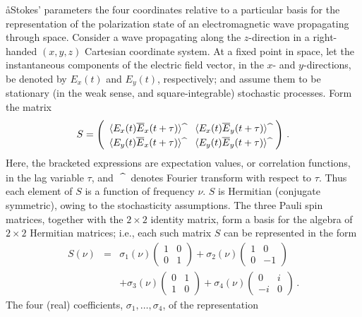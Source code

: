 \aa{Stokes' parameters}
the four coordinates relative to a particular basis
for the representation of the polarization state
of an electromagnetic wave propagating through space.
Consider a wave propagating along the
$z$-direction in a right-handed $(x,y,z)$ Cartesian coordinate system.
At a fixed point in space, let the instantaneous components of the
electric field vector, in the $x$-  and $y$-directions, be denoted
by $E_x(t)$ and $E_y(t)$, respectively; and assume them to be
stationary (in the weak sense, and square-integrable)
stochastic processes.
Form the matrix
$$S=\left( \begin{array}{ll}
             \langle E_x(t)\overline{E}_x(t+\tau)\rangle^\hatsymbol
           & \langle E_x(t)\overline{E}_y(t+\tau)\rangle^\hatsymbol\\
             \langle E_y(t)\overline{E}_x(t+\tau)\rangle^\hatsymbol
           & \langle E_y(t)\overline{E}_y(t+\tau)\rangle^\hatsymbol
            \end{array}\right)\,.$$
Here, the bracketed expressions are expectation values, or correlation
functions, in the lag variable $\tau$,
and $\ {}^\hatsymbol\ $ denotes Fourier transform with respect to $\tau$.
Thus each element of $S$ is a function of frequency $\nu$.
$S$ is Hermitian (conjugate symmetric), owing to the stochasticity assumptions.
The three Pauli spin matrices, together with the $2\times2$ identity
matrix, form a basis for the algebra of $2\times2$ Hermitian matrices;
i.e., each such matrix $S$ can be represented in the form
\begin{eqnarray*}
  S(\nu) & = & \sigma_1(\nu)\left( \begin{array}{cc}
                   1&0\\0&1\end{array}\right)
        +\sigma_2(\nu)\left(\begin{array}{cc} 1&0\\0&-1\end{array}\right)\\
       & &+\sigma_3(\nu)\left(\begin{array}{cc} 0&1\\1&0\end{array}\right)
        +\sigma_4(\nu)\left(\begin{array}{cc}
       0&i\\-i&0\end{array}\right)\,.
\end{eqnarray*}
The four (real) coefficients, $\sigma_1,\dots,\sigma_4$, of the representation
